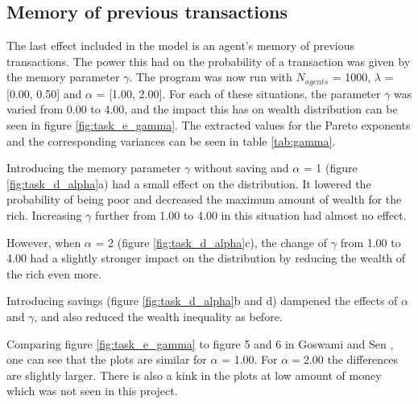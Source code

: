 \documentclass[11pt,a4paper,titlepage]{article}
\begin{document}
\subsection{Memory of previous transactions} 
The last effect included in the model is an agent's memory of previous transactions. The power this had on the probability of a transaction was given by the memory parameter $\gamma$. The program was now run with $N_{agents}$ = 1000, $\lambda$ = [0.00, 0.50] and $\alpha$ = [1.00, 2.00]. For each of these situations, the parameter $\gamma$ was varied from 0.00 to 4.00, and the impact this has on wealth distribution can be seen in figure \ref{fig:task_e_gamma}. The extracted values for the Pareto exponents and the corresponding variances can be seen in table \ref{tab:gamma}.

Introducing the memory parameter $\gamma$ without saving and $\alpha$ = 1 (figure \ref{fig:task_d_alpha}a) had a small effect on the distribution. It lowered the probability of being poor and decreased the maximum amount of wealth for the rich. Increasing $\gamma$ further from 1.00 to 4.00 in this situation had almost no effect. 

However, when $\alpha$ = 2 (figure \ref{fig:task_d_alpha}c), the change of $\gamma$ from 1.00 to 4.00 had a slightly stronger impact on the distribution by reducing the wealth of the rich even more. 

Introducing savings (figure \ref{fig:task_d_alpha}b and d) dampened the effects of $\alpha$ and $\gamma$, and also reduced the wealth inequality as before. 

Comparing figure \ref{fig:task_e_gamma} to figure 5 and 6 in Goswami and Sen \cite{Goswami}, one can see that the plots are similar for $\alpha$ = 1.00. For $\alpha = 2.00$ the differences are slightly larger. There is also a kink in the plots at low amount of money which was not seen in this project.
\end{document}
